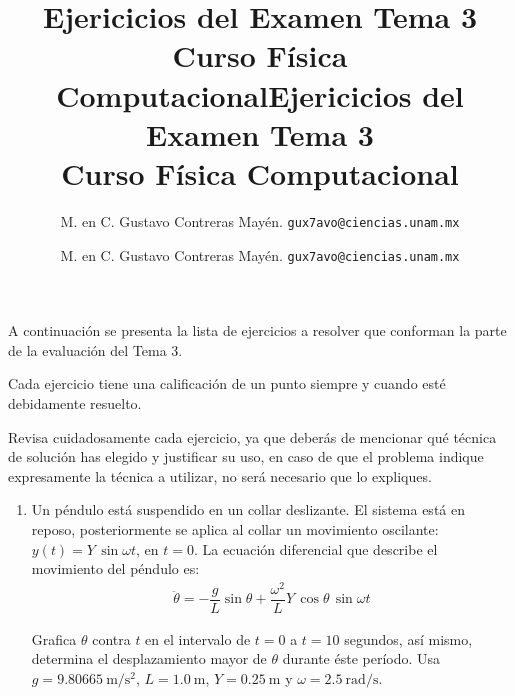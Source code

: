 \documentclass[hidelinks,12pt]{article}
\title{Ejericicios del Examen Tema 3 \\ {\large Curso Física Computacional}}
\author{M. en C. Gustavo Contreras Mayén. \texttt{gux7avo@ciencias.unam.mx}}
\title{Ejericicios del Examen Tema 3 \\ {\large Curso Física Computacional}}
\author{M. en C. Gustavo Contreras Mayén. \texttt{gux7avo@ciencias.unam.mx}}
\date{ }
\begin{document}
\maketitle
\fontsize{14}{14}\selectfont

A continuación se presenta la lista de ejercicios a resolver que conforman la parte de la evaluación del Tema 3.
\par
Cada ejercicio tiene una calificación de un punto siempre y cuando esté debidamente resuelto.
\par
Revisa cuidadosamente cada ejercicio, ya que deberás de mencionar qué técnica de solución has elegido y justificar su uso, en caso de que el problema indique expresamente la técnica a utilizar, no será necesario que lo expliques.

\begin{enumerate}
\item Un péndulo está suspendido en un collar deslizante. El sistema está en reposo, posteriormente se aplica al collar un movimiento oscilante: $y (t) = Y \, \sin \omega t$, en $t = 0$. La ecuación diferencial que describe el movimiento del péndulo es:
\begin{align*}
\ddot{\theta} = - \dfrac{g}{L} \sin \theta + \dfrac{\omega^{2}}{L} Y \, \cos \theta \, \sin \omega t
\end{align*}
\begin{figure}[H]
\centering
{}
\end{figure}
Grafica $\theta$ contra $t$ en el intervalo de $t = 0$ a $t = 10$ segundos, así mismo, determina el desplazamiento mayor de $\theta$ durante éste período. Usa $g = \SI{9.80665}{\meter\per\square\second}$, $L = \SI{1.0}{\meter}$, $Y = \SI{0.25}{\meter}$ y $\omega = \SI{2.5}{\radian\per\second}$.


\end{enumerate}
\end{document}
